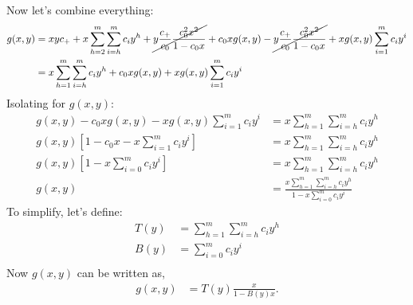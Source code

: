 	Now let's combine everything:
	\begin{align} 
		g(x, y) &= xyc_+ + x \sum_{h=2}^m \sum_{i=h}^{m}c_i y^h + \cancel{y\frac{c_+}{c_0}\frac{c_0^2x^2}{1-c_0x}} + c_0xg(x, y) - \cancel{y\frac{c_+}{c_0}\frac{c_0^2x^2}{1-c_0x}} +  x g(x, y)\sum_{i=1}^m c_{i} y^i\\
		&= x \sum_{h=1}^m\sum_{i=h}^{m}c_i y^h + c_0xg(x, y) + x g(x, y)\sum_{i=1}^m c_{i} y^i
	\end{align}
	Isolating for $g(x, y)$:
	\begin{align}
		g(x, y) - c_0xg(x, y) - x g(x, y)\sum_{i=1}^m c_{i} y^i &= x \sum_{h=1}^m\sum_{i=h}^{m}c_i y^h  \\
		g(x, y)\left[1 - c_0x - x \sum_{i=1}^m c_{i} y^i\right] &= x \sum_{h=1}^m\sum_{i=h}^{m}c_i y^h  \\
		g(x, y)\left[1 - x \sum_{i=0}^m c_{i} y^i\right] &= x \sum_{h=1}^m\sum_{i=h}^{m}c_i y^h  \\
		g(x, y) &= \frac{x \sum_{h=1}^m\sum_{i=h}^{m}c_i y^h}{1 - x \sum_{i=0}^m c_{i} y^i}
	\end{align}
	To simplify, let's define:
	\begin{align}
		T(y) &= \sum_{h=1}^m \sum_{i=h}^{m}c_i y^h\\
		B(y) &= \sum_{i=0}^m c_i y^i\\
	\end{align}
	Now $g(x, y)$ can be written as,
	\begin{align}
		g(x, y) &= T(y)\frac{x}{1- B(y)x}.
	\end{align}
	\newpage
